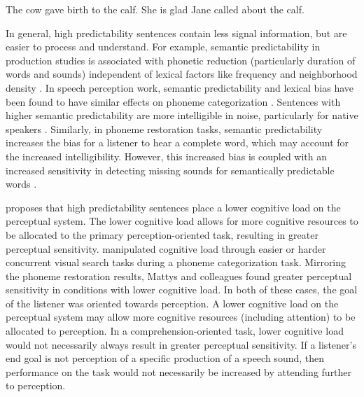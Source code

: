 \ex[exno=1]
The cow gave birth to the calf.
\xe
\ex[exno=2,aboveexskip=0pt]
She is glad Jane called about the calf.
\xe


In general, high predictability sentences contain less signal information, but are easier to process and understand.
For example, semantic predictability in production studies is associated with phonetic reduction (particularly duration of words and sounds) independent of lexical factors like frequency and neighborhood density \citep{Scarborough2010, Clopper2008}.  
In speech perception work, semantic predictability and lexical bias have been found to have similar effects on phoneme categorization \citep{Connine1987,Borsky1998}.
Sentences with higher semantic predictability are more intelligible in noise, particularly for native speakers \citep[and others]{Kalikow1977, Mayo1997, Fallon2002, Bradlow2007}.
Similarly, in phoneme restoration tasks, semantic predictability increases the bias for a listener to hear a complete word, which may account for the increased intelligibility.
However, this increased bias is coupled with an increased sensitivity in detecting missing sounds for semantically predictable words \citep{Samuel1981}.

\citet{Samuel1981} proposes that high predictability sentences place a lower cognitive load on the perceptual system.  
The lower cognitive load allows for more cognitive resources to be allocated to the primary perception-oriented task, resulting in greater perceptual sensitivity.
\citet{Mattys2011} manipulated cognitive load through easier or harder concurrent visual search tasks during a phoneme categorization task.
Mirroring the phoneme restoration results, Mattys and colleagues found greater perceptual sensitivity in conditions with lower cognitive load.
In both of these cases, the goal of the listener was oriented towards perception.
A lower cognitive load on the perceptual system may allow more cognitive resources (including attention) to be allocated to perception.
In a comprehension-oriented task, lower cognitive load would not necessarily always result in greater perceptual sensitivity. 
If a listener's end goal is not perception of a specific production of a speech sound, then performance on the task would not necessarily be increased by attending further to perception.

